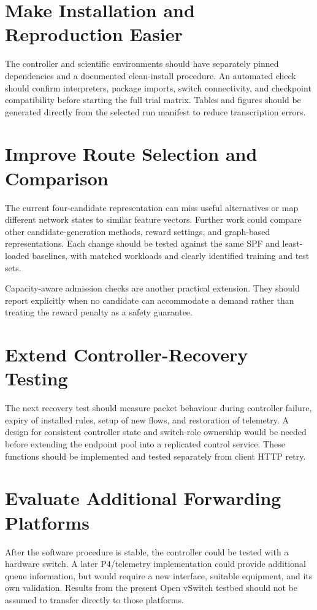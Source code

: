 \documentclass[12pt,a4paper,oneside]{report}
\begin{document}
\section{Make Installation and Reproduction Easier}
The controller and scientific environments should have separately pinned dependencies and a documented clean-install procedure. An automated check should confirm interpreters, package imports, switch connectivity, and checkpoint compatibility before starting the full trial matrix. Tables and figures should be generated directly from the selected run manifest to reduce transcription errors.

\section{Improve Route Selection and Comparison}
The current four-candidate representation can miss useful alternatives or map different network states to similar feature vectors. Further work could compare other candidate-generation methods, reward settings, and graph-based representations. Each change should be tested against the same SPF and least-loaded baselines, with matched workloads and clearly identified training and test sets.

Capacity-aware admission checks are another practical extension. They should report explicitly when no candidate can accommodate a demand rather than treating the reward penalty as a safety guarantee.

\section{Extend Controller-Recovery Testing}
The next recovery test should measure packet behaviour during controller failure, expiry of installed rules, setup of new flows, and restoration of telemetry. A design for consistent controller state and switch-role ownership would be needed before extending the endpoint pool into a replicated control service. These functions should be implemented and tested separately from client HTTP retry.

\section{Evaluate Additional Forwarding Platforms}
After the software procedure is stable, the controller could be tested with a hardware switch. A later P4/telemetry implementation could provide additional queue information, but would require a new interface, suitable equipment, and its own validation. Results from the present Open vSwitch testbed should not be assumed to transfer directly to those platforms.
\end{document}
